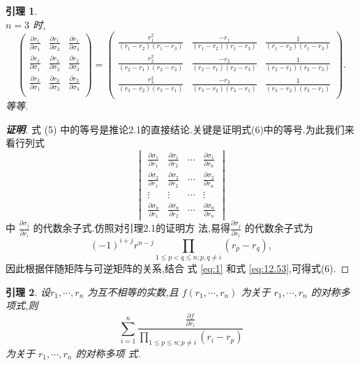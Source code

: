 \documentclass[a4paper]{article}
\newtheorem{lemma}{引理}[section]
\newcommand{\pa}{\partial} \newcommand{\Om}{\Omega}
\begin{document}
\begin{lemma}
$$$$
$n=3$ 时,
$$
\begin{pmatrix}
  \frac{\pa r_1}{\pa \sigma_1}&\frac{\pa r_1}{\pa \sigma_2}&\frac{\pa
    r_1}{\pa \sigma_3}\\
  \frac{\pa r_2}{\pa \sigma_1}&\frac{\pa r_2}{\pa \sigma_2}&\frac{\pa
    r_2}{\pa \sigma_3}\\
  \frac{\pa r_3}{\pa \sigma_1}&\frac{\pa r_3}{\pa \sigma_2}&\frac{\pa
    r_3}{\pa \sigma_3}\\
\end{pmatrix}=\begin{pmatrix}
  \frac{r_1^2}{(r_1-r_2)(r_1-r_3)}&\frac{-r_1}{(r_1-r_2)(r_1-r_3)}&\frac{1}{(r_1-r_2)(r_1-r_3)}\\
  \frac{r_2^2}{(r_2-r_1)(r_2-r_3)}&\frac{-r_2}{(r_2-r_1)(r_2-r_3)}&\frac{1}{(r_2-r_1)(r_2-r_3)}\\
  \frac{r_3^2}{(r_3-r_2)(r_3-r_1)}&\frac{-r_3}{(r_3-r_2)(r_3-r_1)}&\frac{1}{(r_3-r_2)(r_3-r_1)}\\
\end{pmatrix}.
$$
等等.
\end{lemma}
\begin{proof}[\bf{证明}]
  式 (5) 中的等号是推论2.1的直接结论.关键是证明式(6)中的等号.为此我们来
  看行列式
$$
\begin{vmatrix}
  \frac{\pa\sigma_1}{\pa r_1}&\frac{\pa\sigma_1}{\pa
    r_2}&\cdots&\frac{\pa\sigma_1}{\pa r_n}\\
  \frac{\pa\sigma_2}{\pa r_1}&\frac{\pa\sigma_2}{\pa
    r_2}&\cdots&\frac{\pa \sigma_2}{\pa r_n}\\
  \vdots&\vdots&\cdots&\vdots\\
  \frac{\pa \sigma_n}{\pa r_1}&\frac{\pa \sigma_n}{\pa
    r_2}&\cdots&\frac{\pa\sigma_n}{\pa r_n}
\end{vmatrix}
$$
中 $\frac{\pa\sigma_j}{\pa r_i}$ 的代数余子式.仿照对引理2.1的证明方
法,易得$\frac{\pa\sigma_j}{\pa r_i}$ 的代数余子式为
\begin{equation}\label{eq:12.53}
  (-1)^{i+j}r^{n-j}\prod_{1\leq p<q\leq n;p,q\neq i}(r_{p}-r_{q}),
\end{equation}
因此根据伴随矩阵与可逆矩阵的关系,结合
式 \eqref{eq:1} 和式 \eqref{eq:12.53},可得式(6).
\end{proof}
\begin{lemma}
  设$r_1,\cdots,r_n$ 为互不相等的实数,且 $f(r_1,\cdots,r_n)$ 为关于
  $r_1,\cdots,r_n$ 的对称多项式,则
  \begin{equation}\label{eq:10.16}
    \sum_{i=1}^{n}\frac{\frac{\pa f}{\pa r_i}}{\prod_{1\leq p\leq n;p\neq i}(r_i-r_p)}
  \end{equation}
  为关于 $r_1,\cdots,r_n$ 的对称多项
  式.
\end{lemma}
\end{document}

